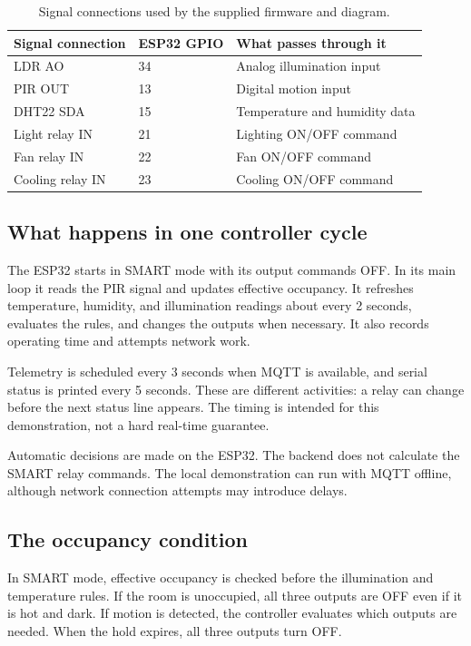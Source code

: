\documentclass[11pt,a4paper]{article}
\begin{document}
\begin{table}[htbp]
\centering
\begin{tabularx}{\textwidth}{@{}l l Y@{}}
\toprule
Signal connection & ESP32 GPIO & What passes through it \\
\midrule
LDR AO & 34 & Analog illumination input \\
PIR OUT & 13 & Digital motion input \\
DHT22 SDA & 15 & Temperature and humidity data \\
Light relay IN & 21 & Lighting ON/OFF command \\
Fan relay IN & 22 & Fan ON/OFF command \\
Cooling relay IN & 23 & Cooling ON/OFF command \\
\bottomrule
\end{tabularx}
\caption{Signal connections used by the supplied firmware and diagram.}
\label{tab:pins}
\end{table}

\subsection{What happens in one controller cycle}
The ESP32 starts in SMART mode with its output commands OFF. In its
main loop it reads the PIR signal and updates effective occupancy.
It refreshes temperature, humidity, and illumination readings about
every 2 seconds, evaluates the rules, and changes the outputs when
necessary. It also records operating time and attempts network work.

Telemetry is scheduled every 3 seconds when MQTT is available, and
serial status is printed every 5 seconds. These are different activities:
a relay can change before the next status line appears. The timing is
intended for this demonstration, not a hard real-time guarantee.

Automatic decisions are made on the ESP32. The backend does not calculate
the SMART relay commands. The local demonstration can run with MQTT
offline, although network connection attempts may introduce delays.

\subsection{The occupancy condition}
In SMART mode, effective occupancy is checked before the illumination
and temperature rules. If the room is unoccupied, all three outputs are
OFF even if it is hot and dark. If motion is detected, the controller
evaluates which outputs are needed. When the hold expires, all three
outputs turn OFF.
\end{document}

